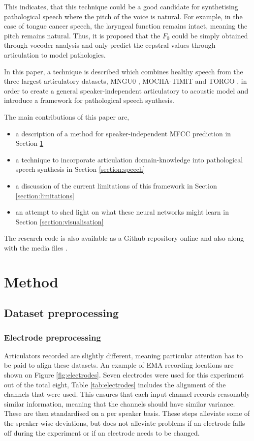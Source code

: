 \documentclass[a4paper]{article}
\begin{document}
This indicates, that this technique could be a good candidate for synthetising
pathological speech where the pitch of the voice is natural. For example,
in the case of tongue cancer speech, the laryngeal function remains intact,
meaning the pitch remains natural. Thus, it is proposed that the \( F_0 \) could
be simply obtained through vocoder analysis and only predict the cepstral
values through articulation to model pathologies.

In this paper, a technique is described which combines healthy speech
from the three largest articulatory datasets, MNGU0 \cite{Richmond2011},
MOCHA-TIMIT and TORGO \cite{Rudzicz2012}, in order to
create a general speaker-independent articulatory to acoustic model and
introduce a framework for pathological speech synthesis.

\noindent The main contributions of this paper are,
\begin{itemize}
\setlength\itemsep{-0.3em}
\item a description of a method for speaker-independent MFCC prediction in Section \ref{section:method}
\item a technique to incorporate articulation domain-knowledge into pathological
  speech synthesis in Section \ref{section:speech} 
\item a discussion of the current limitations of this framework in Section \ref{section:limitations}
\item an attempt to shed light on what these neural networks might learn in Section \ref{section:visualisation}
\end{itemize}

\noindent The research code is also available as a Github repository online and also
along with the media files \cite{Halpern2019}.

\section{Method} \label{section:method}
\subsection{Dataset preprocessing}

\subsubsection{Electrode preprocessing}

Articulators recorded are slightly different, meaning particular attention has to be paid to align these datasets. An example of EMA recording locations are shown on Figure \ref{fig:electrodes}. Seven electrodes were used for this experiment out of the total eight, Table \ref{tab:electrodes} includes
the alignment of the channels that were used. This ensures that each
input channel records reasonably similar information, meaning that the
channels should have similar variance. These are then standardised on a per speaker
basis. These steps alleviate some
of the speaker-wise deviations, but does not alleviate problems if an electrode
falls off during the experiment or if an electrode needs to be changed.
\end{document}
